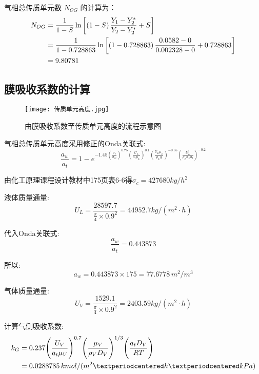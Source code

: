 气相总传质单元数 \( N_{OG} \) 的计算为：
\begin{align}
	N_{OG}
	&= \frac{1}{1-S} \ln \left[\left(1-S\right)\frac{Y_1 - Y_2^{*}}{Y_2 - Y_2^{*}} + S\right] \\
	&= \frac{1}{1-0.728863} \ln \left[\left(1-0.728863\right)\frac{0.0582-0}{0.002328-0}+0.728863\right] \notag \\
	&= 9.80781  \notag
\end{align}

\subsection{膜吸收系数的计算}

\begin{figure}[h]
	\centering
	\texttt{[image: 传质单元高度.jpg]}
	\caption{由膜吸收系数至传质单元高度的流程示意图}
\end{figure}

气相总传质单元高度采用修正的Onda关联式:
\begin{equation}
	\frac{a_{w}}{a_{t}} = 1-e^{-1.45\left(\frac{\sigma_c}{\sigma_w}\right)^{0.75}\left(\frac{U_{L}}{a_{t}\mu_{L}}\right)^{0.1}\left(\frac{U_{L}\mu_{L}}{\rho_{L}g}\right)^{-0.05}\left(\frac{U_{L}^2}{\rho_{L}\sigma_L a_{t}}\right)^{-0.2}}
\end{equation}

由化工原理课程设计教材中175页表6-6得$\sigma_{c} = 427680kg/h^{2}$

液体质量通量:
\begin{equation}
	U_{L} = \frac{28597.7}{\frac{\pi}{4} \times 0.9 ^2} = 44952.7 kg/(m^2·h)
\end{equation}

代入Onda关联式:
\begin{equation}
	\frac{a_{w}}{a_{t}} = 0.443873
\end{equation}

所以:
\begin{equation}
	a_{w} = 0.443873 \times 175 = 77.6778 \, m^2/m^3
\end{equation}

气体质量通量:
\begin{equation}
	U_{V} = \frac{1529.1}{\frac{\pi}{4} \times 0.9 ^2} = 2403.59 kg/(m^2·h)
\end{equation}

计算气侧吸收系数:
\begin{align}
	k_{G}
	&= 0.237\Bigg(\frac{U_{V}}{a_{t}\mu_{V}}\Bigg)^{0.7}\Bigg(\frac{\mu_{V}}{\rho_{V}D_{V}}\Bigg)^{1/3}\Bigg(\frac{a_{t}D_{V}}{RT}\Bigg) \\
	&=
	0.0288785 \, kmol/(m^2·h·kPa) \notag
\end{align}

